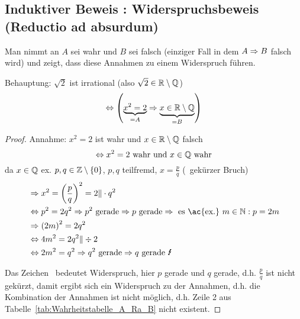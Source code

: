 \subsection{Induktiver Beweis : Widerspruchsbeweis (Reductio ad absurdum)}
Man nimmt an $A$ sei wahr und $B$ sei falsch (einziger Fall in dem $A \Rightarrow B$ falsch wird) und zeigt, dass diese Annahmen zu einem Widerspruch führen.

\begin{example}
Behauptung: $\sqrt{2}$ ist irrational (also $\sqrt{2} \in \mathbb{R} \setminus \mathbb{Q}$) \[\Leftrightarrow \left(\underbrace{x^2 = 2}_{=A} \Rightarrow \underbrace{x \in \mathbb{R} \setminus \mathbb{Q}}_{=B}\right)\]
\end{example}

\begin{proof}
Annahme: $x^2 = 2$ ist wahr und $x \in \mathbb{R} \setminus \mathbb{Q}$ falsch \[\Leftrightarrow x^2 = 2 \text{ wahr und } x \in \mathbb{Q} \text{ wahr}\]
da $x \in \mathbb{Q}$ \ac{ex.} $p, q \in \mathbb{Z} \setminus \left\{0\right\}$, $p, q$ teilfremd, $x = \frac{p}{q}$ (\ra\ gekürzer Bruch)
\begin{align*}
&\Ra x^2 = \rk{\frac{p}{q}}^2 = 2 \Vert \mal q^2\\
&\Lra p^2 = 2q^2 \Ra p^2 \tx{ gerade} \Ra p \tx{ gerade} \Ra \tx{ es \ac{ex.} } m \in \N: p = 2m\\
&\Ra \rk{2m}^2 = 2q^2\\
&\Lra 4m^2 = 2q^2 \Vert \div 2\\
&\Lra 2m^2 = q^2 \Ra q^2 \tx{ gerade} \Ra q \tx{ gerade \Lightning}
\end{align*}

Das Zeichen \Lightning\ bedeutet Widerspruch, hier $p$ gerade und $q$ gerade, \ac{d.h.} $\frac{p}{q}$ ist nicht gekürzt, damit ergibt sich ein Widerspruch zu der Annahmen, \ac{d.h.} die Kombination der Annahmen ist nicht möglich, \ac{d.h.} Zeile 2 aus Tabelle~\vref{tab:Wahrheitstabelle_A_Ra_B} nicht existent.
\end{proof}
